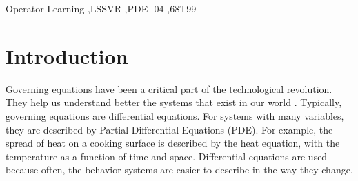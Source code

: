 \documentclass[preprint,12pt,times,authoryear]{elsarticle}
\begin{document}
\begin{frontmatter}
  \title{\judul}
  \author[upi]{Lala Septem Riza}
  \author[upi]{Ahmad Izzuddin}

  \begin{abstract}
    Numerical models of systems are a crucial part of science and engineering. The use of machine learning in this space for operator learning provides an alternative as data-driven surrogates. The Fourier Transform provides a key component for learning the relationship between a function and its derivatives. Building on Spectral Neural Operators (SNO), we propose a Support Vector Machine (SVM) based framework to learn the underlying governing equations of a system based on data. We study the viability and interpretability of the proposed framework on the derivative equation and the Burgers' equation. The model is able to learn from mathematically correct random data and is able to partially generalize to an exact solution of the Burgers' equation. The learned model is interpreted and verified to have learned the correct contributions of the input function coefficients to the output function coefficients.
  \end{abstract}
  \begin{keyword}
    Operator Learning \sep LSSVR \sep PDE
    -04 \sep 68T99
  \end{keyword}

\end{frontmatter}
\section{Introduction}
Governing equations have been a critical part of the technological revolution. They help us understand better the systems that exist in our world \citep{braunDifferentialEquationsTheir1993}. Typically, governing equations are differential equations. For systems with many variables, they are described by Partial Differential Equations (PDE). For example, the spread of heat on a cooking surface is described by the heat equation, with the temperature as a function of time and space. Differential equations are used because often, the behavior systems are easier to describe in the way they change.
\end{document}
